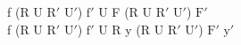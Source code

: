 f (R U $\text{R}'$ $\text{U}'$) $\text{f}'$ U F (R U $\text{R}'$ $\text{U}'$) $\text{F}'$\\
f (R U $\text{R}'$ $\text{U}'$) $\text{f}'$ U R y (R U $\text{R}'$ $\text{U}'$) $\text{F}'$ $\text{y}'$\\
